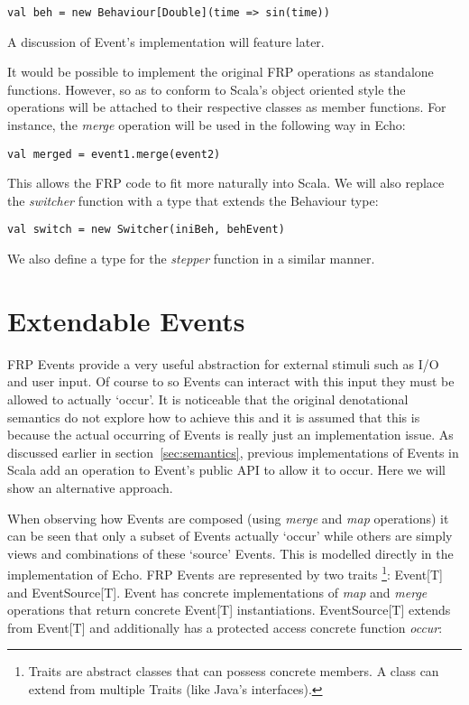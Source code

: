 \begin{verbatim}
val beh = new Behaviour[Double](time => sin(time))
\end{verbatim}  

    A discussion of Event's implementation will feature later.
    
    It would be possible to implement the original FRP operations as standalone functions. However, so
    as to conform to Scala's object oriented style the operations will be attached to their respective
    classes as member functions. For instance, the \emph{merge} operation will be used in the following way in Echo:
    
\begin{verbatim}
val merged = event1.merge(event2)
\end{verbatim}

  This allows the FRP code to fit more naturally into Scala. We will also replace the \emph{switcher} function
  with a type that extends the Behaviour type:
  
\begin{verbatim}
val switch = new Switcher(iniBeh, behEvent)
\end{verbatim}

  We also define a type for the \emph{stepper} function in a similar manner.
  
  \section{Extendable Events}
    FRP Events provide a very useful abstraction for external stimuli such as I/O and user input. Of course
    to so Events can interact with this input they must be allowed to actually `occur'.
    It is noticeable that the original denotational semantics \cite{Elliott1997} do not explore how to achieve
    this and it is assumed that this is because the actual occurring of Events is really just an implementation
    issue. As discussed earlier in section~\ref{sec:semantics}, previous implementations of Events in Scala add an operation to Event's
    public API to allow it to occur. Here we will show an alternative approach.
    
    When observing how Events are composed (using \emph{merge} and \emph{map} operations) it can be seen that
    only a subset of Events actually `occur' while others are simply views and combinations of these `source' Events.
    This is modelled directly in the implementation of Echo. FRP Events are represented by two traits \footnote{Traits are abstract
    classes that can possess concrete members. A class can extend from multiple Traits (like Java's interfaces).}: 
    Event[T] and EventSource[T].
    Event has concrete implementations of \emph{map} and \emph{merge} operations that
    return concrete Event[T] instantiations. EventSource[T] extends
    from Event[T] and additionally has a protected access concrete function \emph{occur}:
    
